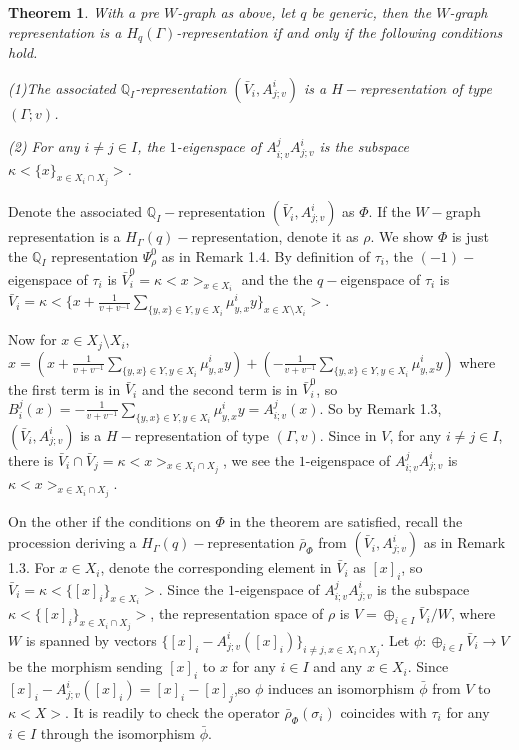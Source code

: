 \def\CTEXPreproc{Created by ctex v0.2.12, don't edit!}\documentclass[11pt]{article}
\newtheorem{thm}{Theorem}[section]
\begin{document}
 \begin{thm} With a pre $W$-graph as above, let $q$ be generic, then the $W$-graph representation is a $H_{q}(\Gamma )$-representation if and only if the following conditions hold.

 \noindent(1)The associated $\mathbb{Q}_I$-representation $(\bar{V}_i , A^i _{j;v} )$ is a $H-$representation of type $(\Gamma ; v)$.

  \noindent (2) For any $i\neq j \in I$, the $1$-eigenspace of $A^j _{i;v} A^i _{j;v }   $ is the subspace $\kappa < \{ x \}_{x\in X_i \cap X_j }   > $.
\end{thm}

\begin{pf} Denote the associated $\mathbb{Q}_{I}-$representation $(\bar{V}_i , A^i _{j;v} )$ as $\Phi$.  If the $W-$graph representation is a $H_{\Gamma}(q)-$representation, denote it as $\rho$. We show $\Phi$ is just the $\mathbb{Q}_{I}$ representation $\Psi^0 _{\rho}$ as in Remark 1.4.   By definition of $\tau_i$, the $(-1)-$eigenspace of $\tau_i$ is
$\bar{V}^0 _i =\kappa < x >_{x\in X_i }$ and the the $q-$eigenspace of $\tau_i$ is
$\bar{V} _i = \kappa < \{ x+ \frac{1}{v+v^{-1}} \sum_{ \{ y,x\} \in Y , y\in X_i }  \mu^i _{y,x} y  \}_{x\in X\setminus X_i} >$.

 Now for
$x\in X_j \setminus X_i $,
$x= ( x+ \frac{1}{v+v^{-1}} \sum_{ \{ y,x\} \in Y , y\in X_i }  \mu^i _{y,x} y ) +   ( -\frac{1}{v+v^{-1}} \sum_{ \{ y,x\} \in Y , y\in X_i }  \mu^i _{y,x} y )  $ where the first term is in $\bar{V}_i $ and the second term is in $\bar{V}^0 _i$, so $ B^j _i (x) =-\frac{1}{v+v^{-1}} \sum_{ \{ y,x\} \in Y , y\in X_i }  \mu^i _{y,x} y =A^j _{i;v} (x) $. So by Remark 1.3,  $(\bar{V}_i , A^i _{j;v})$ is a $H-$representation of type $(\Gamma ,v)$. Since in
$V$, for any $i\neq j\in I $, there is $\bar{V}_i \cap \bar{V}_j =\kappa < x >_{x\in X_i \cap X_j }  $, we see the $1$-eigenspace of $A^j _{i;v} A^i _{j;v}$ is $\kappa < x >_{x\in X_i \cap X_j }$.

On the other if the conditions on $\Phi$ in the theorem are satisfied, recall the procession deriving a $H_{\Gamma}(q)-$representation   $\bar{\rho}_{\Phi}$ from $(\bar{V}_i , A^i _{j;v})$ as in Remark 1.3.  For $x\in X_i $, denote the corresponding element in $\bar{V}_i$ as $[x]_i$, so $\bar{V}_i =\kappa < \{   [x]_i  \}_{x\in X_i}   >$. Since the $1$-eigenspace of $A^j _{i;v} A^i _{j;v }   $ is the subspace $\kappa < \{ [x]_i \}_{x\in X_i \cap X_j }   > $, the representation space of $\rho$ is
$V=  \oplus_{i\in I} \bar{V}_i  / W $, where $W $ is spanned by vectors $\{  [x]_i - A^i _{j;v} (  [x]_i  )    \}_{ i\neq j, x\in X_i \cap X_j}$. Let $\phi: \oplus_{i\in I} \bar{V}_i \rightarrow V  $ be the morphism sending $ [x]_i $ to $x$ for any $i\in I$ and any $x\in X_i$.
Since $ [x]_i - A^i _{j;v} (  [x]_i  )=[x]_i - [x]_j  $,so $\phi$ induces an isomorphism $\bar{\phi}$ from $V$ to $\kappa <  X >$. It is readily to check the operator $ \bar{\rho}_{\Phi}(\sigma_i )  $ coincides with $\tau_i$ for any $i\in I$ through the isomorphism $\bar{\phi}$.
\end{pf}
\end{document}
